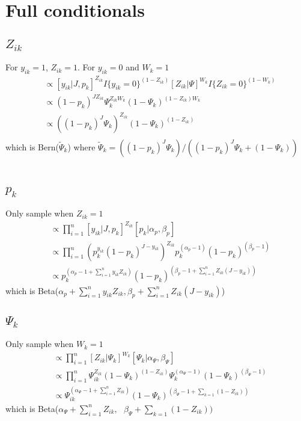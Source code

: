 \documentclass[fleqn]{article}
\begin{document}
\section{Full conditionals}
%
\subsection{$Z_{ik}$}
%
For $y_{ik} = 1$, $Z_{ik} = 1$. For $y_{ik} = 0$ and $W_k = 1$
\begin{align*}
  [Z_ik | \cdot] & \propto [y_{ik} | J, p_k]^{Z_{ik}} I \{y_{ik} = 0 \}^{(1 - Z_{ik})} [Z_{ik} | \Psi]^{W_k} I \{Z_{ik} = 0 \}^{(1 - W_{k})}\\
  & \propto (1 - p_k)^{J Z_{ik}} \Psi_k^{Z_{ik} W_k} (1 - \Psi_k)^{(1 - Z_{ik}) W_k}\\
  & \propto \left( (1 - p_k)^J \Psi_k \right)^{Z_{ik}} \left(1 - \Psi_k \right)^{(1 - Z_{ik})}\\
\end{align*}
which is Bern($\tilde{\Psi}_k$) where $\tilde{\Psi}_k = \left( (1 - p_k)^J \Psi_k \right) / \left( (1 - p_k)^J \Psi_k + (1 - \Psi_k)\right)$\\
\\
%
\subsection{$p_k$}
%
Only sample when $Z_{ik} = 1$
\begin{align*}
  [p_k | \cdot] & \propto \prod_{i = 1}^n [y_{ik} | J, p_k]^{Z_{ik}} [p_k | \alpha_p, \beta_p]\\
  & \propto \prod_{i = 1}^n \left( p_k^{y_{ik}} (1 - p_k)^{J - y_{ik}} \right)^{Z_{ik}} p_k^{(\alpha_p - 1)} (1 - p_k)^{(\beta_p - 1)}\\
    & \propto p_k^{\left( \alpha_p - 1 + \sum_{i = 1}^n y_{ik} Z_{ik} \right)} (1 - p_k)^{\left( \beta_p - 1 + \sum_{i = 1}^n Z_{ik} (J - y_{ik}) \right)}
\end{align*}
%
which is Beta($\alpha_p + \sum_{i = 1}^n y_{ik} Z_{ik}, \beta_p + \sum_{i = 1}^n Z_{ik} (J - y_{ik})$)
%
\subsection{$\Psi_k$}
%
Only sample when $W_k = 1$
%
\begin{align*}
  [\Psi_k | \cdot] & \propto \prod_{i = 1}^n [Z_{ik} | \Psi_k]^{W_k} [\Psi_k | \alpha_\Psi, \beta_\Psi]\\
  & \propto \prod_{i = 1}^n \Psi_{ik}^{Z_{ik}} (1 - \Psi_k)^{(1 - Z_{ik})} \Psi_k^{(\alpha_\Psi - 1)} (1 - \Psi_k)^{(\beta_\Psi - 1)}\\
  & \propto \Psi_{ik}^{(\alpha_\Psi - 1 + \sum_{i = 1}^n Z_{ik})} (1 - \Psi_k)^{(\beta_\Psi - 1 + \sum_{k = 1} (1 - Z_{ik}))}
\end{align*}
which is Beta($\alpha_\Psi + \sum_{i = 1}^n Z_{ik}, \mbox{ } \beta_\Psi + \sum_{k = 1} (1 - Z_{ik}))$
%
\end{document}
